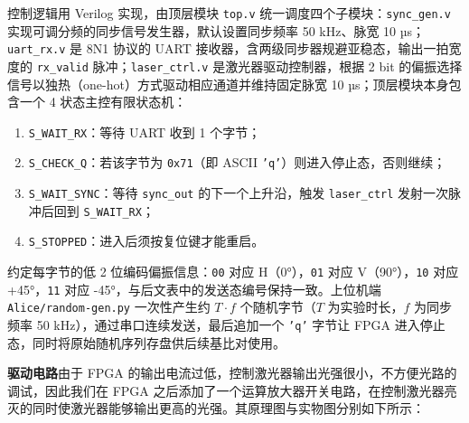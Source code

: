 \documentclass[UTF8]{ctexart}
\begin{document}
控制逻辑用 Verilog 实现，由顶层模块 \texttt{top.v} 统一调度四个子模块：\texttt{sync\_gen.v} 实现可调分频的同步信号发生器，默认设置同步频率 50 kHz、脉宽 10 µs；\texttt{uart\_rx.v} 是 8N1 协议的 UART 接收器，含两级同步器规避亚稳态，输出一拍宽度的 \texttt{rx\_valid} 脉冲；\texttt{laser\_ctrl.v} 是激光器驱动控制器，根据 2 bit 的偏振选择信号以独热（one-hot）方式驱动相应通道并维持固定脉宽 10 µs；顶层模块本身包含一个 4 状态主控有限状态机：

\begin{enumerate}
    \item \texttt{S\_WAIT\_RX}：等待 UART 收到 1 个字节；
    \item \texttt{S\_CHECK\_Q}：若该字节为 \texttt{0x71}（即 ASCII \texttt{'q'}）则进入停止态，否则继续；
    \item \texttt{S\_WAIT\_SYNC}：等待 \texttt{sync\_out} 的下一个上升沿，触发 \texttt{laser\_ctrl} 发射一次脉冲后回到 \texttt{S\_WAIT\_RX}；
    \item \texttt{S\_STOPPED}：进入后须按复位键才能重启。
\end{enumerate}

约定每字节的低 2 位编码偏振信息：\texttt{00} 对应 H（0°），\texttt{01} 对应 V（90°），\texttt{10} 对应 +45°，\texttt{11} 对应 -45°，与后文表中的发送态编号保持一致。上位机端 \texttt{Alice/random-gen.py} 一次性产生约 $T\cdot f$ 个随机字节（$T$ 为实验时长，$f$ 为同步频率 50 kHz），通过串口连续发送，最后追加一个 \texttt{'q'} 字节让 FPGA 进入停止态，同时将原始随机序列存盘供后续基比对使用。

\textbf{驱动电路}\quad 由于 FPGA 的输出电流过低，控制激光器输出光强很小，不方便光路的调试，因此我们在 FPGA 之后添加了一个运算放大器开关电路，在控制激光器亮灭的同时使激光器能够输出更高的光强。其原理图与实物图分别如下所示：
\end{document}
